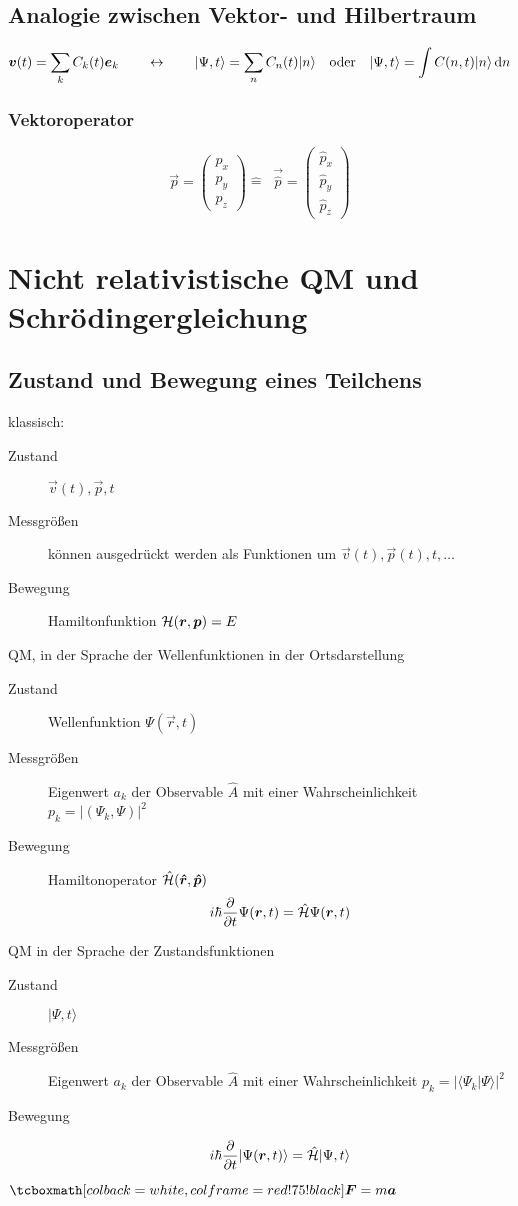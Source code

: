 \subsection{Analogie zwischen Vektor- und Hilbertraum}
$$\bm{v}(t) = \sum_k C_k (t) \bm{e}_k \qquad \leftrightarrow \qquad |\Psi,t\rangle = \sum_n C_n (t) |n\rangle \quad \textrm{oder} \quad |\Psi,t\rangle = \int C(n,t)|n\rangle\mathop{}\!\mathrm{d} n$$

\subsubsection{Vektoroperator}
$$\vec{p} = \begin{pmatrix} p_x \\ p_y \\ p_z \end{pmatrix} \hat = \mathop{} \vec{\hat p} = \begin{pmatrix}\hat p_x \\ \hat p_y \\ \hat p_z \end{pmatrix}$$
\section{Nicht relativistische QM und Schrödingergleichung}
\subsection{Zustand und Bewegung eines Teilchens}

klassisch:
\begin{description}
	\item[Zustand] $\vec{v}(t), \vec{p}, t$
	\item[Messgrößen] können ausgedrückt werden als Funktionen um $\vec{v}(t), \vec{p}(t),t, \dots$
	\item[Bewegung] Hamiltonfunktion $\mathcal{H}(\bm{r},\bm{p}) = E$
\end{description}
QM, in der Sprache der Wellenfunktionen in der Ortsdarstellung
\begin{description}
	\item[Zustand] Wellenfunktion $\Psi(\vec{r},t)$
	\item[Messgrößen] Eigenwert $a_k$ der Observable $\hat A$ mit einer Wahrscheinlichkeit $p_k = |(\Psi_k, \Psi)|^2$
	\item[Bewegung] Hamiltonoperator $\hat {\mathcal{H}}(\bm{\hat r},\bm{\hat p})$
	$$i \hbar \frac{\partial }{\partial t} \Psi(\bm{r}, t) = \hat {\mathcal{H}} \Psi(\bm{r}, t)$$
\end{description}
QM in der Sprache der Zustandsfunktionen
\begin{description}
	\item[Zustand] $|\Psi,t\rangle$
	\item[Messgrößen] Eigenwert $a_k$ der Observable $\hat A$ mit einer Wahrscheinlichkeit $p_k = |\langle\Psi_k | \Psi\rangle|^2$
	\item[Bewegung] $$i \hbar \frac{\partial }{\partial t} | \Psi(\bm{r}, t) \rangle = \hat {\mathcal{H}} |\Psi,t\rangle$$
\end{description}
$ \rmbox{\vec{F} = m \vec{a}} $

